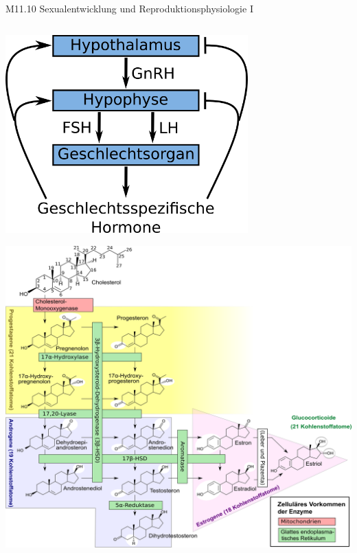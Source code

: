 \documentclass{beamer}
\begin{document}




\begin{frame}{M11.10 Sexualentwicklung und Reproduktionsphysiologie I}

\begin{columns}[c]

\begin{column}{5cm}

\begin{center}
\includegraphics[width=0.7\textwidth]{geschlechtshormone_achse.png}
\end{center}

\pause

\begin{center}
\includegraphics[width=\textwidth]{biosynthese_sexualhormone.png}
\end{center}




\end{column}
\end{columns}
\end{frame}
\end{document}
